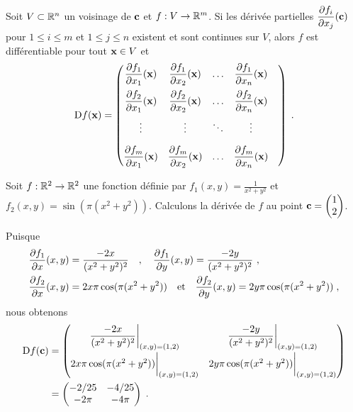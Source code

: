 {\begin{prop}
Soit $V\subset \mathbb{R}^n$ un voisinage de $\mathbf{c}$ et $f:V\rightarrow \mathbb{R}^m$.
Si les dérivée partielles
$\displaystyle \frac{\partial f_i}{\partial x_j}(\mathbf{c})$ pour $1\leq i \leq m$ et
$1\leq j \leq n$ existent et sont continues sur $V$, alors $f$ est
différentiable pour tout $\mathbf{x} \in V$ et
\[
\mathrm{D} f(\mathbf{x}) =
\begin{pmatrix}
\displaystyle \frac{\partial f_1}{\partial x_1}(\mathbf{x}) &
\displaystyle \frac{\partial f_1}{\partial x_2}(\mathbf{x}) & \ldots &
\displaystyle \frac{\partial f_1}{\partial x_n}(\mathbf{x}) \\[1em]
\displaystyle \frac{\partial f_2}{\partial x_1}(\mathbf{x}) &
\displaystyle \frac{\partial f_2}{\partial x_2}(\mathbf{x}) & \ldots &
\displaystyle \frac{\partial f_2}{\partial x_n}(\mathbf{x}) \\[1em]
\vdots & \vdots & \ddots & \vdots & \\[1em]
\displaystyle \frac{\partial f_m}{\partial x_1}(\mathbf{x}) &
\displaystyle \frac{\partial f_m}{\partial x_2}(\mathbf{x}) & \ldots &
\displaystyle \frac{\partial f_m}{\partial x_n}(\mathbf{x})
\end{pmatrix} \; .
\]
\end{prop}

\begin{egg}
Soit $f:\mathbb{R}^2\rightarrow \mathbb{R}^2$ une fonction définie par
$\displaystyle f_1(x,y) = \frac{1}{x^2+y^2}$ et
$f_2(x,y) = \sin(\pi(x^2+y^2))$.  Calculons la dérivée de $f$ au point
$\mathbf{c} = \begin{pmatrix} 1 \\ 2 \end{pmatrix}$.

Puisque
\begin{align*}
\frac{\partial f_1}{\partial x}(x,y) &= \frac{-2x}{(x^2+y^2)^2} \quad , \quad 
\frac{\partial f_1}{\partial y}(x,y) = \frac{-2y}{(x^2+y^2)^2} \ , \\
\frac{\partial f_2}{\partial x}(x,y) &= 2x \pi \cos(\pi(x^2+y^2))
\quad \text{et} \quad 
\frac{\partial f_2}{\partial y}(x,y) = 2y \pi \cos(\pi(x^2+y^2)) \; ,
\end{align*}
nous obtenons
\begin{align*}
\mathrm{D} f(\mathbf{c}) &=
\begin{pmatrix}
\displaystyle \frac{-2x}{(x^2+y^2)^2}\bigg|_{(x,y)=(1,2)} &
\displaystyle \frac{-2y}{(x^2+y^2)^2}\bigg|_{(x,y)=(1,2)} \\[1em]
2x \pi \cos(\pi(x^2+y^2))\bigg|_{(x,y)=(1,2)} &
2y \pi \cos(\pi(x^2+y^2))\bigg|_{(x,y)=(1,2)}
\end{pmatrix} \\
&=
\begin{pmatrix}
-2/25 & -4/25 \\ -2\pi & -4\pi
\end{pmatrix} \; .
\end{align*}
\end{egg}

}
